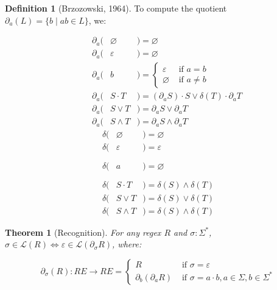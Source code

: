 \documentclass[11pt]{article}
\theoremstyle{plain}
\newtheorem{theorem}{Theorem}
\theoremstyle{definition}
\newtheorem{definition}{Definition}
\begin{document}
\begin{definition}[Brzozowski, 1964]
To compute the quotient \(\partial_a(L) = \{b \mid ab \in L\}\), we:

\vspace{-0.8cm}
\begin{multicols}{2}
\begin{eqnarray*}
\phantom{--}\partial_a(& \varnothing &) = \varnothing                                           \\
\phantom{--}\partial_a(& \varepsilon &) = \varnothing                                           \\
\phantom{--}\partial_a(& b           &) = \begin{cases}\varepsilon &\text{ if } a = b\\ \varnothing &\text{ if } a \neq b \end{cases}\\
\phantom{--}\partial_a(& S\cdot T    &) = (\partial_a S)\cdot S \vee \delta(T)\cdot\partial_a T \\
\phantom{--}\partial_a(& S\vee  T    &) = \partial_a S \vee  \partial_a T                        \\
\phantom{--}\partial_a(& S\land T    &) = \partial_a S \land \partial_a T
\end{eqnarray*} \break\vspace{-0.45cm}
\begin{eqnarray*}
\delta(& \varnothing &)= \varnothing                                      \\
\delta(& \varepsilon &)= \varepsilon                                      \\
\delta(& a           &)= \varnothing\phantom{\begin{cases}\varepsilon\\\varnothing\end{cases}}\\
\delta(& S\cdot T    &)= \delta(S) \land \delta(T)                        \\
\delta(& S\vee T     &)= \delta(S) \vee  \delta(T)                        \\
\delta(& S\land T    &)= \delta(S) \land \delta(T)
\end{eqnarray*}
\end{multicols}
\end{definition}

\begin{theorem}[Recognition]
  For any regex \(R\) and \(\sigma: \Sigma^*\), \(\sigma \in \mathcal{L}(R) \Longleftrightarrow \varepsilon \in \mathcal{L}(\partial_\sigma R)\), where:

  \[
    \partial_\sigma (R): RE \rightarrow RE = \begin{cases}R &\text{ if } \sigma = \varepsilon\\\partial_b(\partial_a R) &\text{ if } \sigma = a \cdot b, a \in \Sigma, b \in \Sigma^* \end{cases}
  \]
\end{theorem}
\end{document}

